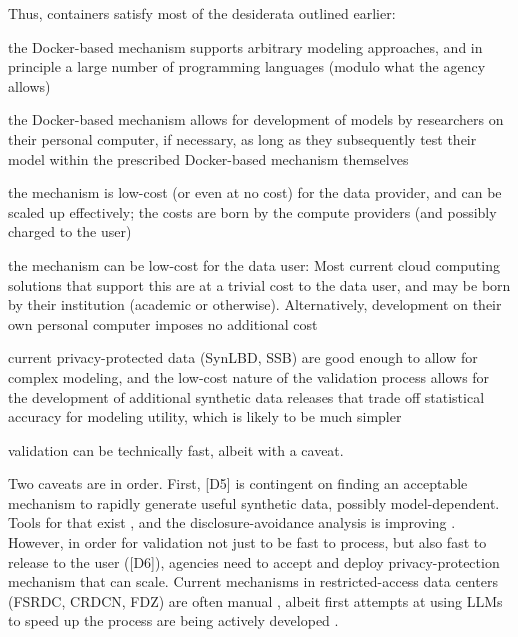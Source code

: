 \documentclass[inline]{hdsr}
\begin{document}
Thus, containers satisfy most of the desiderata outlined earlier: 
\begin{enumerate*}[label={[D\arabic*]}, itemjoin={{; }}, itemjoin*={{, and }}]
    \item the Docker-based mechanism supports arbitrary modeling approaches, and in principle a large number of programming languages (modulo what the agency allows)
    \item the Docker-based mechanism  allows for development of models by researchers on their personal computer, if necessary, as long as they subsequently test their model within the prescribed Docker-based mechanism themselves
    \item the mechanism is low-cost (or even at no cost) for the data provider, and can be scaled up effectively; the costs are born by the compute providers (and possibly charged to the user)
    \item the mechanism can be low-cost for the data user: Most current cloud computing solutions that support this are at a trivial cost to the data user, and may be born by their institution (academic or otherwise). Alternatively, development on their own personal computer imposes no additional cost
    \item current privacy-protected data (SynLBD, SSB) are  good enough to allow for complex modeling, and the low-cost nature of the validation process allows for the development of additional synthetic data releases that trade off statistical accuracy for modeling utility, which is likely to be much simpler
    \item validation can be technically fast, albeit with a caveat.
\end{enumerate*}

Two caveats are in order. First, [D5] is contingent on finding an acceptable mechanism to rapidly generate useful synthetic data, possibly model-dependent. Tools for that exist \citep{synthpop,synthpop2016}, and the disclosure-avoidance analysis is improving \citep{SnokeEtAl2017}. However, in order for validation not just to be fast to process, but also fast to release to the user ([D6]), agencies need to accept and deploy privacy-protection mechanism that can scale. Current mechanisms in restricted-access data centers (FSRDC, \ac{CRDCN}, \ac{FDZ}) are often manual \citep{brandt_guidelines_2010}, albeit first attempts at using \acp{LLM} to speed up the process are being actively developed \citep{rigaud_checking_2023}.

\citet{barrientos_differentially_2021}
\end{document}
